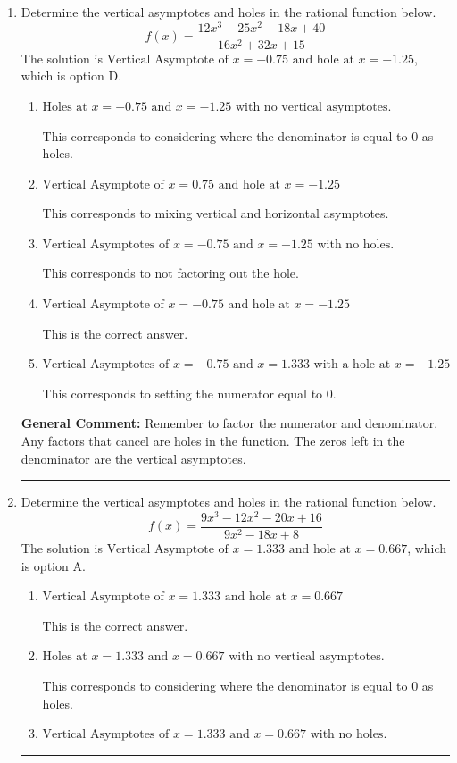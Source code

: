 \documentclass{extbook}[14pt]
\newcommand{\litem}[1]{\item #1

\rule{\textwidth}{0.4pt}}
\begin{document}
\begin{enumerate}\litem{
Determine the vertical asymptotes and holes in the rational function below.
\[ f(x) = \frac{12x^{3} -25 x^{2} -18 x + 40}{16x^{2} +32 x + 15} \]The solution is \( \text{Vertical Asymptote of } x = -0.75 \text{ and hole at } x = -1.25 \), which is option D.\begin{enumerate}[label=\Alph*.]
\item \( \text{Holes at } x = -0.75 \text{ and } x = -1.25 \text{ with no vertical asymptotes.} \)

This corresponds to considering where the denominator is equal to 0 as holes.
\item \( \text{Vertical Asymptote of } x = 0.75 \text{ and hole at } x = -1.25 \)

This corresponds to mixing vertical and horizontal asymptotes.
\item \( \text{Vertical Asymptotes of } x = -0.75 \text{ and } x = -1.25 \text{ with no holes.} \)

This corresponds to not factoring out the hole.
\item \( \text{Vertical Asymptote of } x = -0.75 \text{ and hole at } x = -1.25 \)

This is the correct answer.
\item \( \text{Vertical Asymptotes of } x = -0.75 \text{ and } x = 1.333 \text{ with a hole at } x = -1.25 \)

This corresponds to setting the numerator equal to 0.
\end{enumerate}

\textbf{General Comment:} Remember to factor the numerator and denominator. Any factors that cancel are holes in the function. The zeros left in the denominator are the vertical asymptotes.
}
\litem{
Determine the vertical asymptotes and holes in the rational function below.
\[ f(x) = \frac{9x^{3} -12 x^{2} -20 x + 16}{9x^{2} -18 x + 8} \]The solution is \( \text{Vertical Asymptote of } x = 1.333 \text{ and hole at } x = 0.667 \), which is option A.\begin{enumerate}[label=\Alph*.]
\item \( \text{Vertical Asymptote of } x = 1.333 \text{ and hole at } x = 0.667 \)

This is the correct answer.
\item \( \text{Holes at } x = 1.333 \text{ and } x = 0.667 \text{ with no vertical asymptotes.} \)

This corresponds to considering where the denominator is equal to 0 as holes.
\item \( \text{Vertical Asymptotes of } x = 1.333 \text{ and } x = 0.667 \text{ with no holes.} \)


\end{enumerate}}
\end{enumerate}
\end{document}

